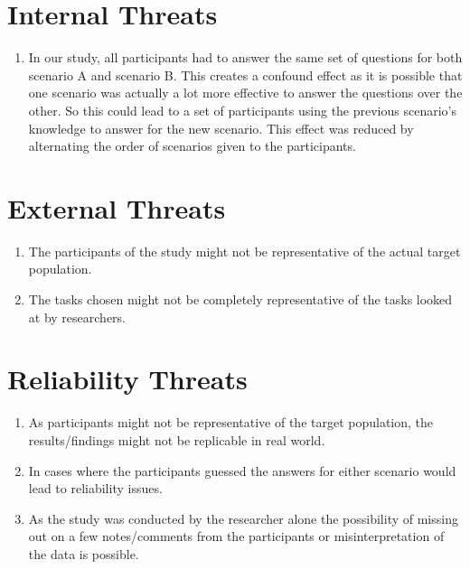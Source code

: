 \documentclass[double,12pt]{beavtex}
\begin{document}
\section{Internal Threats}
\begin{enumerate} 
\item In our study, all participants had to answer the same set of questions for both scenario A and scenario B. This creates a confound effect as it is possible that one scenario was actually a lot more effective to answer the questions over the other. So this could lead to a set of participants using the previous scenario's knowledge to answer for the new scenario. This effect was reduced by alternating the order of scenarios given to the participants.
\end{enumerate}

\section{External Threats}
\begin{enumerate}
\item The participants of the study might not be representative of the actual target population.
\item The tasks chosen might not be completely representative of the tasks looked at by researchers.
\end{enumerate}

\section{Reliability Threats}
\begin{enumerate}
\item As participants might not be representative of the target population, the results/findings might not be replicable in real world.
\item In cases where the participants guessed the answers for either scenario would lead to reliability issues.
\item As the study was conducted by the researcher alone the possibility of missing out on a few notes/comments from the participants or misinterpretation of the data is possible.
\end{enumerate}
\end{document}
